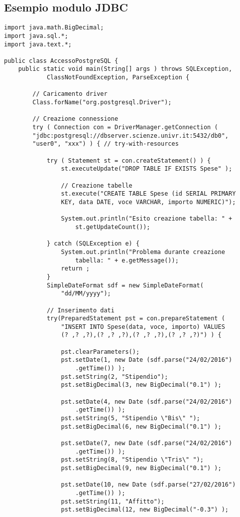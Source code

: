 \documentclass[a4paper, 10pt, titlepage]{article}
\begin{document}
\subsection{Esempio modulo JDBC}
\begin{lstlisting}
import java.math.BigDecimal;
import java.sql.*;
import java.text.*;

public class AccessoPostgreSQL {
	public static void main(String[] args ) throws SQLException, 
			ClassNotFoundException, ParseException {
			
		// Caricamento driver
		Class.forName("org.postgresql.Driver");
		
		// Creazione connessione
		try ( Connection con = DriverManager.getConnection (
		"jdbc:postgresql://dbserver.scienze.univr.it:5432/db0",
		"user0", "xxx") ) { // try-with-resources
		
			try ( Statement st = con.createStatement() ) {
				st.executeUpdate("DROP TABLE IF EXISTS Spese" );
				
				// Creazione tabelle
				st.execute("CREATE TABLE Spese (id SERIAL PRIMARY
				KEY, data DATE, voce VARCHAR, importo NUMERIC)");
				
				System.out.println("Esito creazione tabella: " +
					st.getUpdateCount());
					
			} catch (SQLException e) {
				System.out.println("Problema durante creazione
					tabella: " + e.getMessage());
				return ;
			}
			SimpleDateFormat sdf = new SimpleDateFormat(
				"dd/MM/yyyy");
			
			// Inserimento dati
			try(PreparedStatement pst = con.prepareStatement (
				"INSERT INTO Spese(data, voce, importo) VALUES
				(? ,? ,?),(? ,? ,?),(? ,? ,?),(? ,? ,?)") ) {
				
				pst.clearParameters();
				pst.setDate(1, new Date (sdf.parse("24/02/2016")
					.getTime()) );
				pst.setString(2, "Stipendio");
				pst.setBigDecimal(3, new BigDecimal("0.1") );
				
				pst.setDate(4, new Date (sdf.parse("24/02/2016")
					.getTime()) );
				pst.setString(5, "Stipendio \"Bis\" ");
				pst.setBigDecimal(6, new BigDecimal("0.1") );

				pst.setDate(7, new Date (sdf.parse("24/02/2016")
					.getTime()) );
				pst.setString(8, "Stipendio \"Tris\" ");
				pst.setBigDecimal(9, new BigDecimal("0.1") );

				pst.setDate(10, new Date (sdf.parse("27/02/2016")
					.getTime()) );
				pst.setString(11, "Affitto");
				pst.setBigDecimal(12, new BigDecimal("-0.3") );
				

\end{lstlisting}
\end{document}

